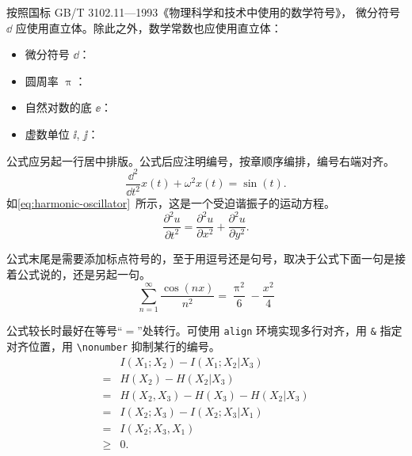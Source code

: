 按照国标 GB/T 3102.11—1993《物理科学和技术中使用的数学符号》，
微分符号 $\dd$ 应使用直立体。除此之外，数学常数也应使用直立体：
\begin{itemize}
  \item 微分符号 $\dd$：
  \item 圆周率 $\uppi$：
  \item 自然对数的底 $\ee$：
  \item 虚数单位 $\ii$, $\jj$： 
\end{itemize}

公式应另起一行居中排版。公式后应注明编号，按章顺序编排，编号右端对齐。
\begin{equation}\label{eq:harmonic-oscillator}
  \frac{\dd^2}{\dd t^2}x(t)+\omega^2x(t)=\sin(t).
\end{equation}
如\cref{eq:harmonic-oscillator}~所示，这是一个受迫谐振子的运动方程。
\begin{equation}
  \frac{\partial^2u}{\partial t^2}=\frac{\partial^2u}{\partial x^2}+\frac{\partial^2u}{\partial y^2}.
\end{equation}

公式末尾是需要添加标点符号的，至于用逗号还是句号，取决于公式下面一句是接着公式说的，还是另起一句。
\begin{equation}
  \sum_{n=1}^{\infty}\frac{\cos(nx)}{n^2}=\frac{\uppi^2}{6}-\frac{x^2}{4}
\end{equation}

公式较长时最好在等号“$=$”处转行。可使用 \texttt{align} 环境实现多行对齐，用 \verb|&| 指定对齐位置，用 \verb|\nonumber| 抑制某行的编号。
\begin{align}
       & I(X_1;X_2)-I(X_1;X_2|X_3) \nonumber    \\
  =    & H(X_2)-H(X_2|X_3) \nonumber            \\
  =    & H(X_2,X_3)-H(X_3)-H(X_2|X_3) \nonumber \\
  =    & I(X_2;X_3)-I(X_2;X_3|X_1) \nonumber    \\
  =    & I(X_2;X_3,X_1) \nonumber               \\
  \geq & 0.
\end{align}

